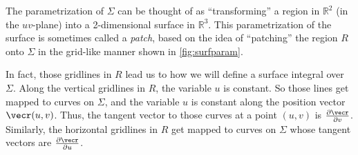 The parametrization of $\Sigma$ can be thought of as ``transforming'' a region in $\mathbb{R}^{2}$ (in the $uv$-plane) into a 2-dimensional surface in $\mathbb{R}^{3}$. This parametrization of the surface is sometimes called a \emph{patch}, based on the idea of ``patching'' the region $R$ onto $\Sigma$ in the grid-like manner shown in \autoref{fig:surfparam}.

In fact, those gridlines in $R$ lead us to how we will define a surface integral over $\Sigma$. Along the vertical gridlines in $R$, the variable $u$ is constant. So those lines get mapped to curves on $\Sigma$, and the variable $u$ is constant along the position vector $\vecr(u,v)$. Thus, the tangent vector to those curves at a point $(u,v)$ is $\frac{\partial \vecr}{\partial v}$. Similarly, the horizontal gridlines in $R$ get mapped to curves on $\Sigma$ whose tangent vectors are $\frac{\partial \vecr}{\partial u}$.

